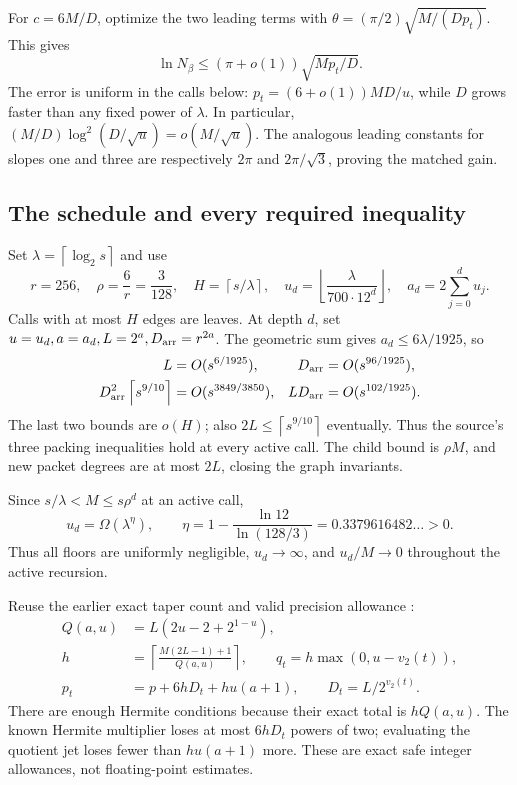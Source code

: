 \documentclass[11pt,letterpaper]{article}
\theoremstyle{definition}\newtheorem{definition}[theorem]{Definition}
\theoremstyle{remark}\newtheorem{remark}[theorem]{Remark}
\newcommand{\vTwo}{v_2}
\newcommand{\ceil}[1]{\left\lceil#1\right\rceil}
\newcommand{\floor}[1]{\left\lfloor#1\right\rfloor}
\begin{document}
For $c=6M/D$, optimize the two leading terms with
$\theta=(\pi/2)\sqrt{M/(Dp_t)}$. This gives
\begin{equation}\label{eq:percall}
 \ln N_\beta\le(\pi+o(1))\sqrt{Mp_t/D}.
\end{equation}
The error is uniform in the calls below: $p_t=(6+o(1))MD/u$, while
$D$ grows faster than any fixed power of $\lambda$. In particular,
$(M/D)\log^2(D/\sqrt u)=o(M/\sqrt u)$.
The analogous leading constants for slopes one and three are respectively
$2\pi$ and $2\pi/\sqrt3$, proving the matched gain.

\subsection{The schedule and every required inequality}

Set $\lambda=\ceil{\log_2s}$ and use
\begin{equation}\label{eq:schedule}
 r=256,\quad\rho=\frac6r=\frac3{128},\quad
 H=\ceil{s/\lambda},\quad
 u_d=\floor{\frac{\lambda}{700\cdot12^d}},\quad
 a_d=2\sum_{j=0}^d u_j.
\end{equation}
Calls with at most $H$ edges are leaves. At depth $d$, set
$u=u_d,a=a_d,L=2^a,D_{\rm arr}=r^{2a}$.
The geometric sum gives $a_d\le6\lambda/1925$, so
\begin{align*}
 L&=O(s^{6/1925}),&D_{\rm arr}&=O(s^{96/1925}),\\
 D_{\rm arr}^2\ceil{s^{9/10}}&=O(s^{3849/3850}),&
 LD_{\rm arr}&=O(s^{102/1925}).
\end{align*}
The last two bounds are $o(H)$; also $2L\le\ceil{s^{9/10}}$
eventually. Thus the source's three packing inequalities hold at every
active call. The child bound is $\rho M$, and new packet degrees are at
most $2L$, closing the graph invariants.

Since $s/\lambda<M\le s\rho^d$ at an active call,
\[
 u_d=\Omega(\lambda^\eta),\qquad
 \eta=1-\frac{\ln12}{\ln(128/3)}=0.3379616482\ldots>0.
\]
Thus all floors are uniformly negligible, $u_d\to\infty$, and
$u_d/M\to0$ throughout the active recursion.

Reuse the earlier exact taper count and valid precision allowance
\cite{precision,schedule}:
\begin{align}
 Q(a,u)&=L(2u-2+2^{1-u}),\nonumber\\
 h&=\ceil{\frac{M(2L-1)+1}{Q(a,u)}},\qquad
 q_t=h\max(0,u-\vTwo(t)),\label{eq:taper}\\
 p_t&=p+6hD_t+hu(a+1),\qquad D_t=L/2^{\vTwo(t)}.
 \label{eq:precision}
\end{align}
There are enough Hermite conditions because their exact total is $hQ(a,u)$.
The known Hermite multiplier loses at most $6hD_t$ powers of two; evaluating
the quotient jet loses fewer than $hu(a+1)$ more. These are exact safe
integer allowances, not floating-point estimates.
\end{document}
